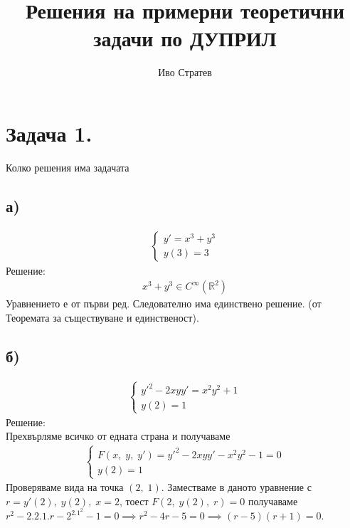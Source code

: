 \documentclass[a4paper, 12pt, oneside]{article}
\title{Решения на примерни теоретични задачи по ДУПРИЛ}
\author{Иво Стратев}
\newcommand{\R}{\mathbb{R}}
\begin{document}
\maketitle
    
\tableofcontents

\section{Задача 1.} Колко решения има задачата

\subsection{а)}
\begin{align*}
\begin{cases}
    y' = x^3 + y^3 \\
    y(3) = 3
\end{cases}
\end{align*}
Решение: \\
\begin{align*}
    x^3 + y^3 \in C^\infty (\R^2)
\end{align*}
Уравнението е от първи ред. Следователно има единствено решение. (от Теоремата за съществуване и единственост).
\subsection{б)}
\begin{align*}
    \begin{cases}
        y'^2 - 2xyy' = x^2y^2 + 1\\
        y(2) = 1
    \end{cases}
\end{align*}
Решение: \\

Прехвърляме всичко от едната страна и получаваме
\begin{align*}
    \begin{cases}
        F(x, \; y, \; y') = y'^2 - 2xyy' - x^2y^2 - 1 = 0 \\
        y(2) = 1
    \end{cases}
\end{align*}
Проверяваме вида на точка $(2, \; 1)$. Заместваме в даното уравнение с \\

$r = y'(2), \; y(2), \; x = 2$, тоест $F(2, \; y(2), \; r) = 0$ получаваме \\

$r^2 - 2.2.1.r - 2^2.1^2 - 1 = 0 \implies r^2 - 4r - 5 = 0 \implies (r - 5)(r + 1) = 0$. \\
\end{document}
